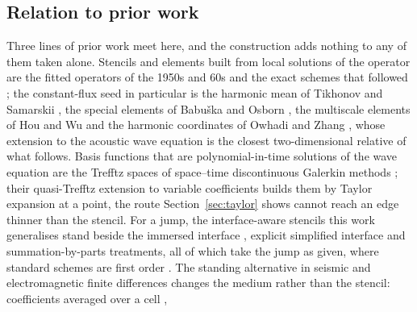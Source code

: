 \documentclass[11pt]{amsart}
\theoremstyle{definition}
\theoremstyle{remark}
\begin{document}
\subsection{Relation to prior work}
\label{sec:priorwork}
Three lines of prior work meet here, and the construction adds nothing to
any of them taken alone. Stencils and elements built from local solutions
of the operator are the fitted operators of the 1950s and 60s
\cite{AllenSouthwell1955,Ilin1969,ScharfetterGummel1969,RoosStynesTobiska2008}
and the exact schemes that followed \cite{Mickens1993,VizvariEtAl2020};
the constant-flux seed in particular is the harmonic mean of Tikhonov and
Samarskii \cite{TikhonovSamarskii1962,Samarskii2001}, the special elements
of Babu\v{s}ka and Osborn \cite{BabuskaOsborn1983,BabuskaCalozOsborn1994},
the multiscale elements of Hou and Wu \cite{HouWu1997} and the harmonic
coordinates of Owhadi and Zhang \cite{OwhadiZhang2007}, whose extension to
the acoustic wave equation \cite{OwhadiZhang2008} is the closest
two-dimensional relative of what follows. Basis functions that are
polynomial-in-time solutions of the wave equation are the Trefftz spaces
of space--time discontinuous Galerkin methods
\cite{KretzschmarMoiolaPerugiaSchnepp2016,BanjaiGeorgoulisLijoka2017,MoiolaPerugia2018};
their quasi-Trefftz extension to variable coefficients
\cite{ImbertGerardMoiolaStocker2023,ImbertGerardMoiolaPerinatiStocker2025,ImbertGerard2025local}
builds them by Taylor expansion at a point, the route
Section~\ref{sec:taylor} shows cannot reach an edge thinner than the
stencil. For a jump, the interface-aware stencils this work generalises
\cite{Martin2016,MartinFornbergStCyr2015,MartinFornberg2017} stand beside
the immersed interface \cite{LeVequeLi1994,ZhangLeVeque1997,SabatiniEtAl2023},
explicit simplified interface \cite{PirauxLombard2001,LombardPiraux2004}
and summation-by-parts \cite{MattssonNordstrom2006,DuruVirta2014,GranathWang2025}
treatments, all of which take the jump as given, where standard schemes
are first order \cite{Brown1984,SymesVdovina2009,VishnevskyEtAl2014}.
The standing alternative in seismic and electromagnetic finite differences
changes the medium rather than the stencil: coefficients averaged over a
cell \cite{Backus1962,MuirEtAl1992,MoczoEtAl2002,KristekEtAl2017,JiangZhang2024,FarjadpourEtAl2006},
\end{document}
